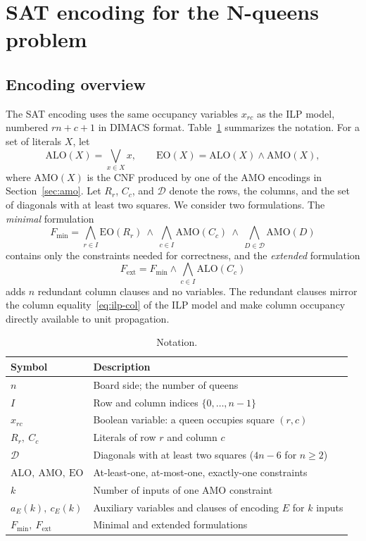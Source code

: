 \documentclass[a4paper,fleqn]{cas-sc}
\newcommand{\AMO}{\mathrm{AMO}}
\newcommand{\ALO}{\mathrm{ALO}}
\newcommand{\EO}{\mathrm{EO}}
\begin{document}
\section{SAT encoding for the N-queens problem}
\label{sec:sat}
\subsection{Encoding overview}
The SAT encoding uses the same occupancy variables $x_{rc}$ as the ILP
model, numbered $rn+c+1$ in DIMACS format. Table~\ref{tab:notation}
summarizes the notation. For a set of literals $X$, let
\begin{equation}
\ALO(X)=\bigvee_{x\in X}x,\qquad
\EO(X)=\ALO(X)\wedge\AMO(X),
\end{equation}
where $\AMO(X)$ is the CNF produced by one of the AMO encodings in
Section~\ref{sec:amo}. Let $R_r$, $C_c$, and $\mathcal D$ denote the
rows, the columns, and the set of diagonals with at least two squares.
We consider two formulations. The \emph{minimal} formulation
\begin{equation}
F_{\min}=\bigwedge_{r\in I}\EO(R_r)\ \wedge\
\bigwedge_{c\in I}\AMO(C_c)\ \wedge\
\bigwedge_{D\in\mathcal D}\AMO(D)
\label{eq:fmin}
\end{equation}
contains only the constraints needed for correctness, and the
\emph{extended} formulation
\begin{equation}
F_{\mathrm{ext}}=F_{\min}\wedge\bigwedge_{c\in I}\ALO(C_c)
\label{eq:fext}
\end{equation}
adds $n$ redundant column clauses and no variables. The redundant
clauses mirror the column equality~\eqref{eq:ilp-col} of the ILP model
and make column occupancy directly available to unit propagation.
\begin{table}[pos=htbp]
\centering\small
\caption{Notation.}
\label{tab:notation}
\begin{tabular}{ll}\toprule
Symbol & Description\\\midrule
$n$ & Board side; the number of queens\\
$I$ & Row and column indices $\{0,\ldots,n-1\}$\\
$x_{rc}$ & Boolean variable: a queen occupies square $(r,c)$\\
$R_r,\ C_c$ & Literals of row $r$ and column $c$\\
$\mathcal D$ & Diagonals with at least two squares ($4n-6$ for $n\ge2$)\\
$\ALO,\ \AMO,\ \EO$ & At-least-one, at-most-one, exactly-one constraints\\
$k$ & Number of inputs of one AMO constraint\\
$a_E(k),\ c_E(k)$ & Auxiliary variables and clauses of encoding $E$ for $k$ inputs\\
$F_{\min},\ F_{\mathrm{ext}}$ & Minimal and extended formulations\\
\bottomrule
\end{tabular}
\end{table}
\end{document}
